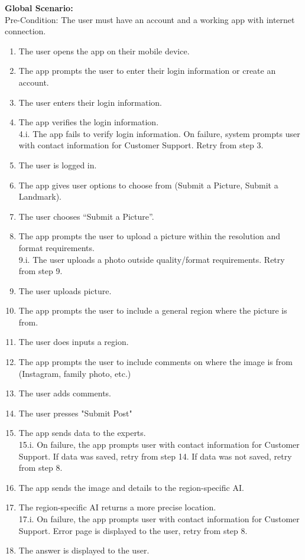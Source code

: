 \documentclass[]{article}
\begin{document}
\begin{enumerate}[{\bf BE1.}]
		{\bf Global Scenario:}\\
            Pre-Condition: The user must have an account and a working app with internet connection. 
		      \begin{enumerate}[{1.}]
                    \item The user opens the app on their mobile device.
                        \item The app prompts the user to enter their login information or create an account.
                        \item The user enters their login information.
                        \item The app verifies the login information. \\ 4.i. The app fails to verify login information. On failure, system prompts user with contact information for Customer Support. Retry from step 3.
                        \item The user is logged in.
                        \item The app gives user options to choose from (Submit a Picture, Submit a Landmark). 
                        \item The user chooses “Submit a Picture”. 
                        \item The app prompts the user to upload a picture within the resolution and format requirements. \\ 9.i. The user uploads a photo outside quality/format requirements. Retry from step 9.\\
                        \item The user uploads picture.
                        \item The app prompts the user to include a general region where the picture is from. 
                        \item The user does inputs a region. 
                        \item The app prompts the user to include comments on where the image is from (Instagram, family photo, etc.) 
                        \item The user adds comments.
                        \item The user presses "Submit Post"
                        \item The app sends data to the experts. \\ 15.i. On failure, the app prompts user with contact information for Customer Support. If data was saved, retry from step 14. If data was not saved, retry from step 8. 
                        \item The app sends the image and details to the region-specific AI. 
                        \item The region-specific AI returns a more precise location. \\ 17.i. On failure, the app prompts user with contact information for Customer Support. Error page is displayed to the user, retry from step 8.
                        \item The answer is displayed to the user. 
                \end{enumerate}
                

\end{enumerate}
\end{document}
